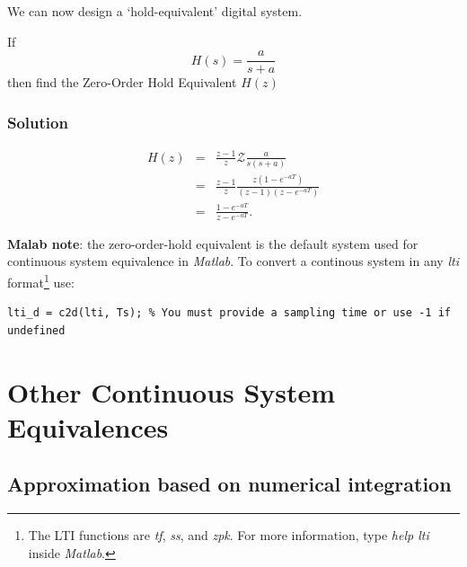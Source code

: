 We can now design a `hold-equivalent' digital system.

\ifslidesonly
\begin{slide}

\end{slide}
\fi


\begin{slide}\label{slide:l11s11}
  If \[H(s) = \frac{a}{s+a}\] then find the Zero-Order Hold Equivalent $H(z)$
\end{slide}

\subsubsection*{Solution}
\begin{eqnarray*}
  H(z) &=& \frac{z-1}{z}\mathcal{Z} \frac{a}{s(s+a)}\\
       &=& \frac{z-1}{z} \frac{z(1-e^{-aT})}{(z-1)(z-e^{-aT})}\\
       &=& \frac{1-e^{-aT}}{z-e^{-aT}}.
\end{eqnarray*}

\textbf{Malab note}: the zero-order-hold equivalent is the default
system used for continuous system equivalence in \emph{Matlab}. To
convert a continous system in any \emph{lti} format\footnote{%
The LTI functions are \emph{tf}, \emph{ss}, and \emph{zpk}. For more
information, type \emph{help lti} inside \emph{Matlab}.} use:
\begin{verbatim}
lti_d = c2d(lti, Ts); % You must provide a sampling time or use -1 if undefined
\end{verbatim}

\section*{Other Continuous System Equivalences}

\subsection*{Approximation based on numerical integration}

\ifslidesonly
\begin{slide}

\end{slide}
\fi


